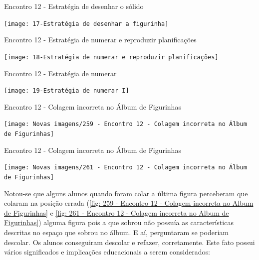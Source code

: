 \begin{CenteredFigure}
    \caption{Encontro 12 - Estratégia de desenhar o sólido} \label{fig:17-estretegia de desenhar}
    \texttt{[image: 17-Estratégia de desenhar a figurinha]}
    \legend{\autoria}
\end{CenteredFigure}

\begin{CenteredFigure}
    \caption{Encontro 12 - Estratégia de numerar e reproduzir planificações} \label{fig:18-estrategia de reproduzir}
    \texttt{[image: 18-Estratégia de numerar e reproduzir planificações]}
    \legend{\autoria}
\end{CenteredFigure}

\begin{CenteredFigure}
    \caption{Encontro 12 - Estratégia de numerar} \label{fig:19-estrategia de numerar}
    \texttt{[image: 19-Estratégia de numerar I]}
    \legend{\autoria}
\end{CenteredFigure}

\begin{CenteredFigure}
    \caption{Encontro 12 - Colagem incorreta no Álbum de Figurinhas} \label{fig: 259 - Encontro 12 - Colagem incorreta no Album de Figurinhas}
    \texttt{[image: Novas imagens/259 - Encontro 12 - Colagem incorreta no Álbum de Figurinhas]}
    \legend{\autoria}
\end{CenteredFigure}

\begin{CenteredFigure}
    \caption{Encontro 12 - Colagem incorreta no Álbum de Figurinhas} \label{fig: 261 - Encontro 12 - Colagem incorreta no Album de Figurinhas}
    \texttt{[image: Novas imagens/261 - Encontro 12 - Colagem incorreta no Álbum de Figurinhas]}
    \legend{\autoria}
\end{CenteredFigure}

Notou-se que alguns alunos quando foram colar a última figura perceberam que colaram na posição errada (\autoref{fig: 259 - Encontro 12 - Colagem incorreta no Album de Figurinhas} e \autoref{fig: 261 - Encontro 12 - Colagem incorreta no Album de Figurinhas}) alguma figura pois a que sobrou não possuía as características descritas no espaço que sobrou no álbum. E aí, perguntaram se poderiam descolar. Os alunos conseguiram descolar e refazer, corretamente. Este fato possui vários significados e implicações educacionais a serem considerados:

